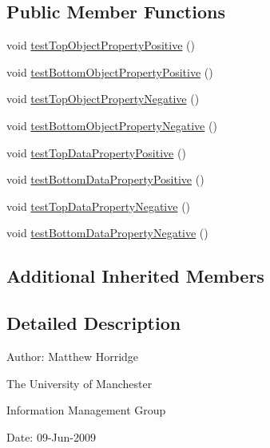 \subsection*{Public Member Functions}
\begin{DoxyCompactItemize}
\item 
void \hyperlink{classorg_1_1semanticweb_1_1owlapi_1_1api_1_1test_1_1axioms_1_1_built_in_property_test_case_a641dbe6c099db8c9a1064c03d8e11a11}{test\-Top\-Object\-Property\-Positive} ()
\item 
void \hyperlink{classorg_1_1semanticweb_1_1owlapi_1_1api_1_1test_1_1axioms_1_1_built_in_property_test_case_a32072618d2749190fd06163f56f772d3}{test\-Bottom\-Object\-Property\-Positive} ()
\item 
void \hyperlink{classorg_1_1semanticweb_1_1owlapi_1_1api_1_1test_1_1axioms_1_1_built_in_property_test_case_a718aff300b5a0f66880316448b57f4dd}{test\-Top\-Object\-Property\-Negative} ()
\item 
void \hyperlink{classorg_1_1semanticweb_1_1owlapi_1_1api_1_1test_1_1axioms_1_1_built_in_property_test_case_ae36b51c25fc9b2196d473229b9053139}{test\-Bottom\-Object\-Property\-Negative} ()
\item 
void \hyperlink{classorg_1_1semanticweb_1_1owlapi_1_1api_1_1test_1_1axioms_1_1_built_in_property_test_case_ae0dbfd1eecc5ef2ed79d51c339037d65}{test\-Top\-Data\-Property\-Positive} ()
\item 
void \hyperlink{classorg_1_1semanticweb_1_1owlapi_1_1api_1_1test_1_1axioms_1_1_built_in_property_test_case_a98d54d540ac84489a34c952202f980f9}{test\-Bottom\-Data\-Property\-Positive} ()
\item 
void \hyperlink{classorg_1_1semanticweb_1_1owlapi_1_1api_1_1test_1_1axioms_1_1_built_in_property_test_case_abd454012a4c23c962b6c0066b22a828d}{test\-Top\-Data\-Property\-Negative} ()
\item 
void \hyperlink{classorg_1_1semanticweb_1_1owlapi_1_1api_1_1test_1_1axioms_1_1_built_in_property_test_case_a8caaa43a3e3910062cf0e0bef9e01288}{test\-Bottom\-Data\-Property\-Negative} ()
\end{DoxyCompactItemize}
\subsection*{Additional Inherited Members}


\subsection{Detailed Description}
Author\-: Matthew Horridge\par
 The University of Manchester\par
 Information Management Group\par
 Date\-: 09-\/\-Jun-\/2009 

